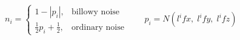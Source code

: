 \documentclass[border=6pt]{standalone}
\begin{document}
\color{white}
\(\displaystyle
n_i =
\begin{cases}
1-\left|p_i\right|, & \text{billowy noise}\\[3pt]
\frac{1}{2}p_i+\frac{1}{2}, & \text{ordinary noise}
\end{cases}
\qquad
p_i=N\!\left(l^i f x,\;l^i f y,\;l^i f z\right)
\)
\end{document}
